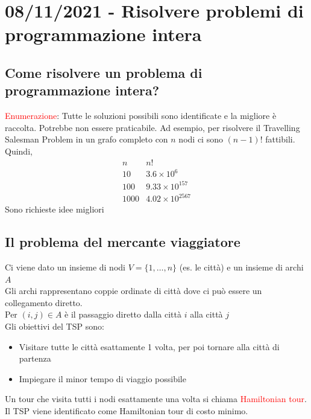 \documentclass[12pt,a4paper]{article}
\begin{document}
\clearpage
\section{08/11/2021 - Risolvere problemi di programmazione intera}
\subsection{Come risolvere un problema di programmazione intera?}
\textcolor{red}{Enumerazione}: Tutte le soluzioni possibili sono identificate e la migliore è
raccolta. Potrebbe non essere praticabile. Ad esempio, per risolvere il
Travelling Salesman Problem in un grafo completo con $n$ nodi ci sono $(n-1)!$ fattibili. Quindi,
$$\begin{array}{c|c}
n & n!\\
10 & 3.6 \times 10^6\\
100 & 9.33 \times 10^{157}\\
1000 & 4.02 \times 10^{2567}
\end{array}$$
Sono richieste idee migliori

\subsection{Il problema del mercante viaggiatore}
Ci viene dato un insieme di nodi $V=\{1,\dots,n\}$ (es. le città) e un insieme di archi $A$\\
Gli archi rappresentano coppie ordinate di città dove ci può essere un collegamento diretto.\\
Per $(i,j)\in A$ è il passaggio diretto dalla città $i$ alla città $j$\\
Gli obiettivi del TSP sono:
\begin{itemize}
\item Visitare tutte le città esattamente 1 volta, per poi tornare alla città di partenza
\item Impiegare il minor tempo di viaggio possibile
\end{itemize}
Un tour che visita tutti i nodi esattamente una volta si chiama \textcolor{red}{Hamiltonian tour}. Il TSP viene identificato come Hamiltonian tour di costo minimo.
\end{document}
